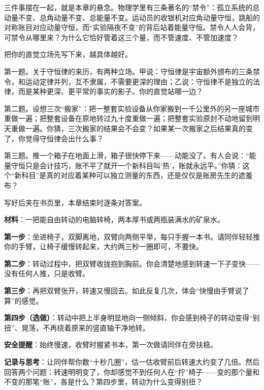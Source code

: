 三件事摆在一起，就是本章的悬念。物理学里有三条著名的“禁令”：孤立系统的总动量不变、总角动量不变、总能量不变。运动员的收银机对应角动量守恒，跳船的对称账目对应动量守恒，而“实验隔夜不变”的背后站着能量守恒。禁令人人会背，可禁令从哪里来？为什么它恰好管着这三个量，而不管速度、不管加速度？


把你的直觉立场先写下来，越具体越好。

第一题。关于守恒律的来历，有两种立场。甲说：守恒律是宇宙额外颁布的三条禁令，和运动定律并列，互不隶属，不需要更深的理由；乙说：守恒律不是独立的法律，而是某种更深、更平常的事实的影子。你的直觉站哪一边？

第二题。设想三次“搬家”：把一整套实验设备从你家搬到一千公里外的另一座城市重做一遍；把整套设备在原地转过九十度重做一遍；把整套实验原封不动地留到明天重做一遍。你猜，三次搬家的结果会不会变？如果某一次搬家之后结果真的变了，你觉得守恒律会出什么事？

第三题。推一个箱子在地面上滑，箱子很快停下来——动能没了。有人会说：“能量守恒只是会计技巧，账不平了就开一个新科目叫‘热’，账就永远平。”你猜：这个“新科目”是真的对应着某种可以独立测量的东西，还是仅仅是账房先生的遮羞布？

写好后夹在书页里，本章结束时逐条对答案。


\begin{experiment}[转椅上的收银机]
\textbf{材料}：一把能自由转动的电脑转椅，两本厚书或两瓶装满水的矿泉水。

\textbf{第一步}：坐进椅子，双脚离地，双臂向两侧平举，每只手握一本书。请同伴轻轻推你的手臂，让椅子缓慢转起来，大约两三秒一圈即可，不要快。

\textbf{第二步}：转动过程中，把双臂收拢抱到胸前。你会清楚地感到转速一下子变快——没有任何人推，只是收臂。

\textbf{第三步}：再把双臂张开，转速又慢回去。如此反复几次，体会“快慢由手臂说了算”的感觉。

\textbf{第四步（选做）}：转动中把上半身明显地向一侧倾斜，你会感到椅子的转动变得“别扭”、晃荡，不再绕着原来的竖直轴干净地转。

\textbf{安全提醒}：始终慢速，收臂时握紧书本，第一次做请同伴在旁扶稳。

\textbf{记录与思考}：让同伴帮你数“十秒几圈”，估一估收臂前后转速大约变了几倍。然后回答两个问题：转速明明变了，你却感觉不到任何人在“拧”椅子——变的那个量和不变的那笔“账”，各是什么？第四步里，转动为什么变得别扭？
\end{experiment}

